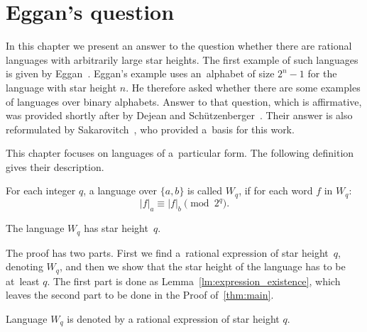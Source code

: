 \chapter{Eggan's question}

In this chapter we present an answer to the question whether there are rational languages with arbitrarily large star heights. The first example of such languages is given by Eggan~\cite{Eggan63}. Eggan's example uses an~alphabet of size $2^n - 1$ for the language with star height $n$. He therefore asked whether there are some examples of languages over binary alphabets. Answer to that question, which is affirmative, was provided shortly after by Dejean and Schützenberger~\cite{DejeanSchutzenberger66}. Their answer is also reformulated by Sakarovitch~\cite{Sakarovitch09}, who  provided a~basis for this work.

This chapter focuses on languages of a~particular form. The following definition gives their description.

\begin{defn}
    For each integer $q$, a language over $\{a, b\}$ is called $W_q$, if for each word $f$ in $W_q$:
    \[
        |f|_a \equiv |f|_b \pmod{2^q}.
    \]
\end{defn}

\begin{thm}\label{thm:main}
    The language $W_q$ has star height~$q$.
\end{thm}

The proof has two parts. First we find a~rational expression of star height~$q$, denoting $W_q$, and then we show that the star height of the language has to be at~least $q$. The first part is done as Lemma~\ref*{lm:expression_existence}, which leaves the second part to be done in the Proof of~\autoref*{thm:main}.

\begin{lemma}\label{lm:expression_existence}
    Language $W_q$ is denoted by a rational expression of star height $q$.
\end{lemma}

